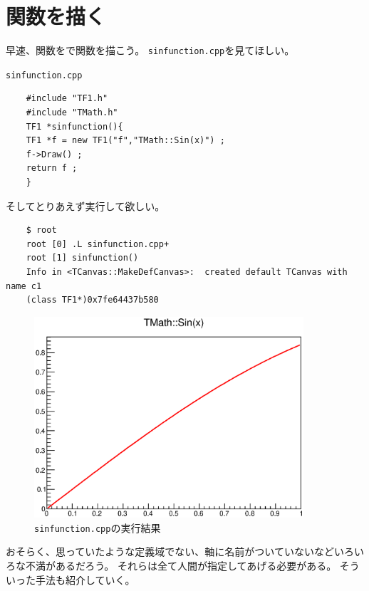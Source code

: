 \documentclass{jarticle}
\begin{document}
 \section{関数を描く}
 早速、関数を\ROOT で関数を描こう。
 \verb|sinfunction.cpp|を見てほしい。
 \begin{itembox}{\texttt{sinfunction.cpp}}
\begin{verbatim}
	#include "TF1.h"
	#include "TMath.h"
	TF1 *sinfunction(){
	TF1 *f = new TF1("f","TMath::Sin(x)") ;
	f->Draw() ;
	return f ;
	}
\end{verbatim}
 \end{itembox}
 そしてとりあえず実行して欲しい。
\begin{verbatim}
	$ root
	root [0] .L sinfunction.cpp+
	root [1] sinfunction()
	Info in <TCanvas::MakeDefCanvas>:  created default TCanvas with name c1
	(class TF1*)0x7fe64437b580
\end{verbatim}
\begin{figure}[htbp]
 \begin{center}
  \includegraphics[width = 100mm]{./picture/sinfunctioncanvas1.eps}
 \end{center}
 \caption{\texttt{sinfunction.cpp}の実行結果}
 \label{Fig:sinfunctioncanvas1}
\end{figure}
おそらく、思っていたような定義域でない、軸に名前がついていないなどいろいろな不満があるだろう。
それらは全て人間が指定してあげる必要がある。
そういった手法も紹介していく。
\end{document}
